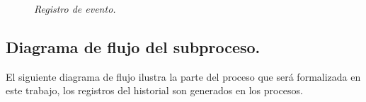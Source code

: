 \documentclass[12pt,a4paper,table]{article}
\begin{document}
\begin{figure}[h]
\centering
{}
\caption{\textit{Registro de evento.}} \label{fig:M1}
\end{figure}

\subsection{Diagrama de flujo del subproceso.}
El siguiente diagrama de flujo ilustra la parte del proceso que será formalizada en este trabajo, los registros del historial son generados en los procesos.
\end{document}
